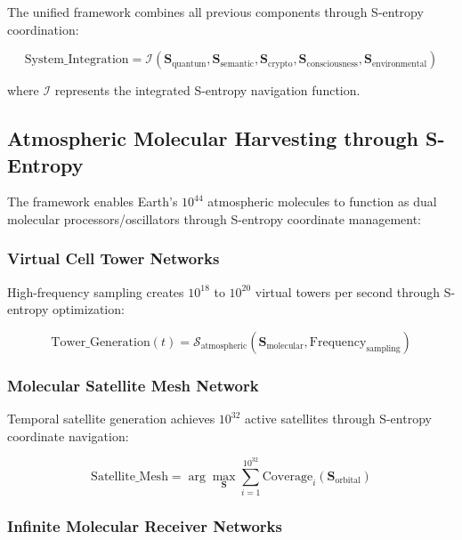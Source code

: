 \documentclass[12pt,a4paper]{article}
\begin{document}
{The unified framework combines all previous components through S-entropy coordination:

\begin{equation}
\text{System\_Integration} = \mathcal{I}(\mathbf{S}_{\text{quantum}}, \mathbf{S}_{\text{semantic}}, \mathbf{S}_{\text{crypto}}, \mathbf{S}_{\text{consciousness}}, \mathbf{S}_{\text{environmental}})
\end{equation}

where $\mathcal{I}$ represents the integrated S-entropy navigation function.

\subsection{Atmospheric Molecular Harvesting through S-Entropy}

The framework enables Earth's $10^{44}$ atmospheric molecules to function as dual molecular processors/oscillators through S-entropy coordinate management:

\subsubsection{Virtual Cell Tower Networks}

High-frequency sampling creates $10^{18}$ to $10^{20}$ virtual towers per second through S-entropy optimization:

\begin{equation}
\text{Tower\_Generation}(t) = \mathcal{S}_{\text{atmospheric}}(\mathbf{S}_{\text{molecular}}, \text{Frequency}_{\text{sampling}})
\end{equation}

\subsubsection{Molecular Satellite Mesh Network}

Temporal satellite generation achieves $10^{32}$ active satellites through S-entropy coordinate navigation:

\begin{equation}
\text{Satellite\_Mesh} = \arg\max_{\mathbf{S}} \sum_{i=1}^{10^{32}} \text{Coverage}_i(\mathbf{S}_{\text{orbital}})
\end{equation}

\subsubsection{Infinite Molecular Receiver Networks}

}
\end{document}
